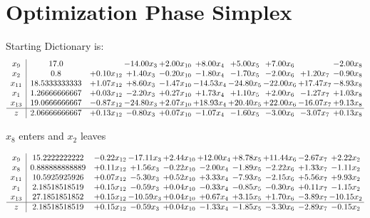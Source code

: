 \documentclass[9pt]{article}
\begin{document}
\section{Optimization Phase Simplex}
Starting Dictionary is:
\[\begin{array}{c| c c@{\hskip 2pt} c@{\hskip 2pt} c@{\hskip 2pt} c@{\hskip 2pt} c@{\hskip 2pt} c@{\hskip 2pt} c@{\hskip 2pt} c@{\hskip 2pt} }
 x_{9}   &  17.0  &   & -14.00 x_{3} & +  2.00 x_{10} & +  8.00 x_{4} & +  5.00 x_{5} & +  7.00 x_{6} &   & -2.00 x_{8}\\
 x_{2}   &  0.8 & +  0.10 x_{12} & +  1.40 x_{3} & -0.20 x_{10} & -1.80 x_{4} & -1.70 x_{5} & -2.00 x_{6} & +  1.20 x_{7} & -0.90 x_{8}\\
 x_{11}   &  18.5333333333 & +  1.07 x_{12} & +  8.60 x_{3} & -1.47 x_{10} & -14.53 x_{4} & -24.80 x_{5} & -22.00 x_{6} & + 17.47 x_{7} & -8.93 x_{8}\\
 x_{1}   &  1.26666666667 & +  0.03 x_{12} & -2.20 x_{3} & +  0.27 x_{10} & +  1.73 x_{4} & +  1.10 x_{5} & +  2.00 x_{6} & -1.27 x_{7} & +  1.03 x_{8}\\
 x_{13}   &  19.0666666667 & -0.87 x_{12} & -24.80 x_{3} & +  2.07 x_{10} & + 18.93 x_{4} & + 20.40 x_{5} & + 22.00 x_{6} & -16.07 x_{7} & +  9.13 x_{8}\\
\hline
z    &  2.06666666667 & +  0.13 x_{12} & -0.80 x_{3} & +  0.07 x_{10} & -1.07 x_{4} & -1.60 x_{5} & -3.00 x_{6} & -3.07 x_{7} & +  0.13 x_{8}\\
\end{array}\]


 $ x_{8} $ enters and $ x_{2} $ leaves 

 \[\begin{array}{c| c c@{\hskip 2pt} c@{\hskip 2pt} c@{\hskip 2pt} c@{\hskip 2pt} c@{\hskip 2pt} c@{\hskip 2pt} c@{\hskip 2pt} c@{\hskip 2pt} }
 x_{9}   &  15.2222222222 & -0.22 x_{12} & -17.11 x_{3} & +  2.44 x_{10} & + 12.00 x_{4} & +  8.78 x_{5} & + 11.44 x_{6} & -2.67 x_{7} & +  2.22 x_{2}\\
 x_{8}   &  0.888888888889 & +  0.11 x_{12} & +  1.56 x_{3} & -0.22 x_{10} & -2.00 x_{4} & -1.89 x_{5} & -2.22 x_{6} & +  1.33 x_{7} & -1.11 x_{2}\\
 x_{11}   &  10.5925925926 & +  0.07 x_{12} & -5.30 x_{3} & +  0.52 x_{10} & +  3.33 x_{4} & -7.93 x_{5} & -2.15 x_{6} & +  5.56 x_{7} & +  9.93 x_{2}\\
 x_{1}   &  2.18518518519 & +  0.15 x_{12} & -0.59 x_{3} & +  0.04 x_{10} & -0.33 x_{4} & -0.85 x_{5} & -0.30 x_{6} & +  0.11 x_{7} & -1.15 x_{2}\\
 x_{13}   &  27.1851851852 & +  0.15 x_{12} & -10.59 x_{3} & +  0.04 x_{10} & +  0.67 x_{4} & +  3.15 x_{5} & +  1.70 x_{6} & -3.89 x_{7} & -10.15 x_{2}\\
\hline
z    &  2.18518518519 & +  0.15 x_{12} & -0.59 x_{3} & +  0.04 x_{10} & -1.33 x_{4} & -1.85 x_{5} & -3.30 x_{6} & -2.89 x_{7} & -0.15 x_{2}\\
\end{array}\]
\end{document}
